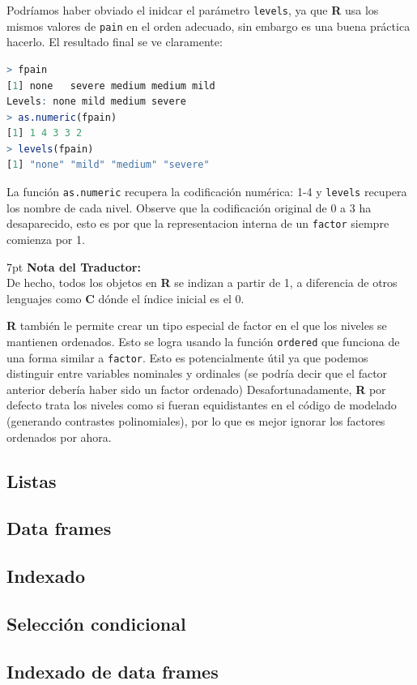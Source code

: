 \documentclass[spanish]{extbook}
\newenvironment{tradnote}{%
  \def\FrameCommand{%
    \hspace{1pt}%
    {\color{darkblue}\vrule width 2pt}%
    {\color{formalshade}\vrule width 4pt}%
    \colorbox{formalshade}%
  }%
  \vspace{12pt}
  \MakeFramed{\advance\hsize-\width\FrameRestore}%
  \noindent\hspace{-4.55pt}%
  \begin{adjustwidth}{}{7pt}%
  \vspace{1pt}%
  \textbf{Nota del Traductor:\\}%
}
{%
  \vspace{6pt}\end{adjustwidth}\endMakeFramed%
}
\numberwithin{equation}{section}
\numberwithin{figure}{section}
\begin{document}
Podríamos haber obviado el inidcar el parámetro \texttt{levels}, ya que \textbf{R} usa
los mismos valores de \texttt{pain} en el orden adecuado, sin embargo es una buena
práctica hacerlo. El resultado final se ve claramente:

\begin{lstlisting}[language=R]
> fpain
[1] none   severe medium medium mild  
Levels: none mild medium severe
> as.numeric(fpain)
[1] 1 4 3 3 2
> levels(fpain)
[1] "none" "mild" "medium" "severe"
\end{lstlisting}

La función \texttt{as.numeric} recupera la codificación numérica: 1-4 y \texttt{levels} recupera
los nombre de cada nivel. Observe que la codificación original de 0 a 3 ha
desaparecido, esto es por que la representacion interna de un \texttt{factor} siempre
comienza por 1. 

\begin{tradnote} De hecho, todos los objetos en \textbf{R} se indizan a partir de 1, a
diferencia de otros lenguajes como \textbf{C} dónde el índice inicial es el
0.\end{tradnote}

\textbf{R} también le permite crear un tipo especial de factor en el que los
niveles se mantienen ordenados.  Esto se logra usando la función
\texttt{ordered} que funciona de una forma similar a \texttt{factor}.  Esto es
potencialmente útil ya que podemos distinguir entre variables nominales y
ordinales (se podría decir que el factor anterior debería haber sido un factor
ordenado) Desafortunadamente, \textbf{R} por defecto trata los niveles como si
fueran equidistantes en el código de modelado (generando contrastes
polinomiales), por lo que es mejor ignorar los factores ordenados por ahora.

\subsection{Listas}
\subsection{Data frames}
\subsection{Indexado}
\subsection{Selección condicional}
\subsection{Indexado de data frames}
\end{document}
